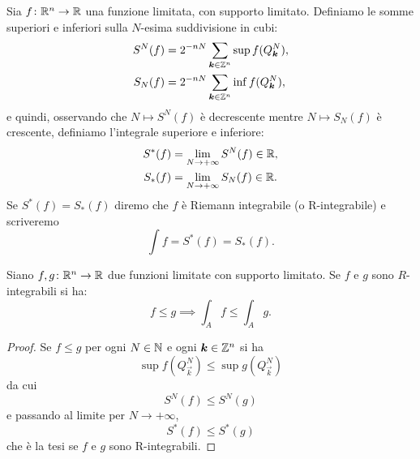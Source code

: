 \begin{definition}
  \label{def:integrale_riemann}
Sia $f\colon {\mathbb R}^n \to {\mathbb R}$ una funzione limitata, 
con supporto limitato.
Definiamo le somme superiori e inferiori sulla $N$-esima suddivisione in cubi:
\begin{align*}
    S^N(f) &= 2^{-nN}\sum_{\boldsymbol k\in {\mathbb Z}^n} \sup f(Q^N_{\boldsymbol k}), \\
    S_N(f) &= 2^{-nN}\sum_{\boldsymbol k\in {\mathbb Z}^n} \inf f(Q^N_{\boldsymbol k}),
\end{align*}
e quindi, osservando che $N\mapsto S^N(f)$ è decrescente 
mentre $N\mapsto S_N(f)$ è crescente, definiamo
l'integrale superiore e inferiore:
\begin{align*}
    S^*(f) &= \lim_{N\to +\infty} S^N(f) \in {\mathbb R}, \\
    S_*(f) &= \lim_{N\to +\infty} S_N(f) \in {\mathbb R}.
\end{align*}
Se $S^*(f)=S_*(f)$ diremo che $f$ è Riemann integrabile (o R-integrabile)
e scriveremo
\[
  \int f = S^*(f) = S_*(f).
\]
\end{definition}

\begin{theorem}
Siano $f,g\colon {\mathbb R}^n\to{\mathbb R}$ due funzioni limitate con supporto limitato.
Se $f$ e $g$ sono $R$-integrabili si ha:
\[
  f \le g \implies \int_A f \le \int_A g.
\]
\end{theorem}
%
\begin{proof}
Se $f\le g$ per ogni $N\in {\mathbb N}$ e ogni $\boldsymbol k \in {\mathbb Z}^n$ si ha 
\[
    \sup f(Q^N_{\vec k}) \le \sup g(Q^N_{\vec k}) 
\]
da cui 
\[
    S^N(f) \le S^N(g)
\]
e passando al limite per $N\to +\infty$,
\[
  S^*(f) \le S^*(g)
\]
che è la tesi se $f$ e $g$ sono R-integrabili.
\end{proof}

